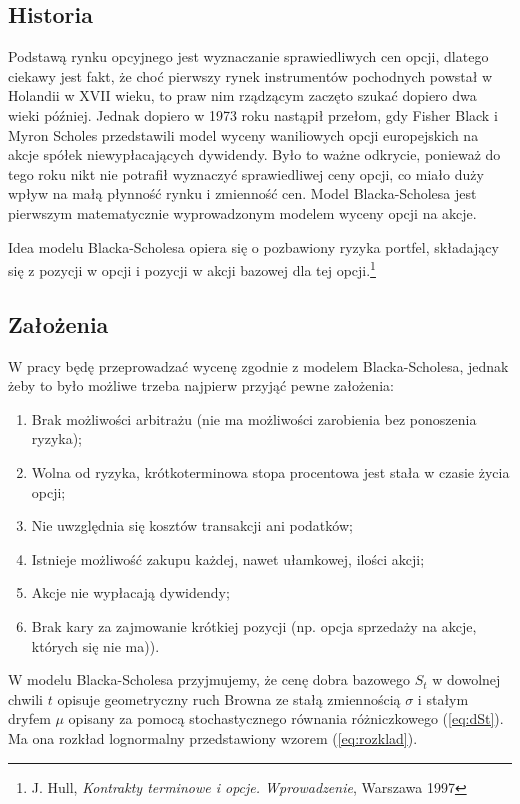 \documentclass[]{pwr_wmat_praca_dyplomowa}
\theoremstyle{plain}
\numberwithin{theorem}{chapter}
\theoremstyle{definition}
\numberwithin{theorem}{chapter}
\begin{document}
\subsection{Historia}
Podstawą rynku opcyjnego jest wyznaczanie sprawiedliwych cen opcji, dlatego ciekawy jest fakt, że choć pierwszy rynek instrumentów pochodnych powstał w Holandii w XVII wieku, to praw nim rządzącym zaczęto szukać dopiero dwa wieki później. Jednak dopiero w 1973 roku nastąpił przełom, gdy Fisher Black i Myron Scholes przedstawili model wyceny waniliowych opcji europejskich na akcje spółek niewypłacających dywidendy. Było to ważne odkrycie, ponieważ do tego roku nikt nie potrafił wyznaczyć sprawiedliwej ceny opcji, co miało duży wpływ na małą płynność rynku i zmienność cen. Model Blacka-Scholesa jest pierwszym matematycznie wyprowadzonym modelem wyceny opcji na akcje.

Idea modelu Blacka-Scholesa opiera się o pozbawiony ryzyka portfel, składający się z pozycji w opcji i pozycji w akcji bazowej dla tej opcji.\footnote{J. Hull, \textit{Kontrakty terminowe i opcje. Wprowadzenie}, Warszawa 1997}

\subsection{Założenia}

W pracy będę przeprowadzać wycenę zgodnie z modelem Blacka-Scholesa, jednak żeby to było możliwe trzeba najpierw przyjąć pewne założenia: 

\begin{enumerate}
\item Brak możliwości arbitrażu (nie ma możliwości zarobienia bez ponoszenia ryzyka);
\item Wolna od ryzyka, krótkoterminowa stopa procentowa jest stała w czasie życia opcji;
\item Nie uwzględnia się kosztów transakcji ani podatków;
\item Istnieje możliwość zakupu każdej, nawet ułamkowej, ilości akcji;
\item Akcje nie wypłacają dywidendy;
\item Brak kary za zajmowanie krótkiej pozycji (np. opcja sprzedaży na akcje, których się nie ma)).
\end{enumerate}
W modelu Blacka-Scholesa przyjmujemy, że cenę dobra bazowego $S_t$ w dowolnej chwili $t$ opisuje geometryczny ruch Browna ze stałą zmiennością $\sigma$ i  stałym dryfem $\mu$ opisany za pomocą stochastycznego równania różniczkowego (\ref{eq:dSt}). Ma ona rozkład lognormalny przedstawiony wzorem (\ref{eq:rozklad}).
\end{document}
